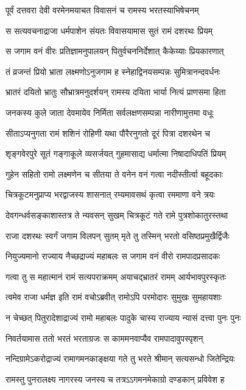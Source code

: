 \twolineshloka
{पूर्वं दत्तवरा देवी वरमेनमयाचत}
{विवासनं च रामस्य भरतस्याभिषेचनम्}%

\twolineshloka
{स सत्यवचनाद्राजा धर्मपाशेन संयतः}
{विवासयामास सुतं रामं दशरथः प्रियम्}%

\twolineshloka
{स जगाम वनं वीरः प्रतिज्ञामनुपालयन्}
{पितुर्वचननिर्देशात् कैकेय्याः प्रियकारणात्}%

\twolineshloka
{तं व्रजन्तं प्रियो भ्राता लक्ष्मणोऽनुजगाम ह}
{स्नेहाद्विनयसम्पन्नः सुमित्रानन्दवर्धनः}%

\twolineshloka
{भ्रातरं दयितो भ्रातुः सौभ्रात्रमनुदर्शयन्}
{रामस्य दयिता भार्या नित्यं प्राणसमा हिता}%

\twolineshloka
{जनकस्य कुले जाता देवमायेव निर्मिता}
{सर्वलक्षणसम्पन्ना नारीणामुत्तमा वधूः}%

\twolineshloka
{सीताऽप्यनुगता रामं शशिनं रोहिणी यथा}
{पौरैरनुगतो दूरं पित्रा दशरथेन च}%

\twolineshloka
{शृङ्गवेरपुरे सूतं गङ्गाकूले व्यसर्जयत्}
{गुहमासाद्य धर्मात्मा निषादाधिपतिं प्रियम्}%

\twolineshloka
{गुहेन सहितो रामो लक्ष्मणेन च सीतया}
{ते वनेन वनं गत्वा नदीस्तीर्त्वा बहूदकाः}%

\twolineshloka
{चित्रकूटमनुप्राप्य भरद्वाजस्य शासनात्}
{रम्यमावसथं कृत्वा रममाणा वने त्रयः}%

\twolineshloka
{देवगन्धर्वसङ्काशास्तत्र ते न्यवसन् सुखम्}
{चित्रकूटं गते रामे पुत्रशोकातुरस्तथा}%

\twolineshloka
{राजा दशरथः स्वर्गं जगाम विलपन् सुतम्}
{मृते तु तस्मिन् भरतो वसिष्ठप्रमुखैर्द्विजैः}%

\twolineshloka
{नियुज्यमानो राज्याय नैच्छद्राज्यं महाबलः}
{स जगाम वनं वीरो रामपादप्रसादकः}%

\twolineshloka
{गत्वा तु स महात्मानं रामं सत्यपराक्रमम्}
{अयाचद्भ्रातरं रामम् आर्यभावपुरस्कृतः}%

\twolineshloka
{त्वमेव राजा धर्मज्ञ इति रामं वचोऽब्रवीत्}
{रामोऽपि परमोदारः सुमुखः सुमहायशाः}%

\twolineshloka
{न चेच्छत् पितुरादेशाद्राज्यं रामो महाबलः}
{पादुके चास्य राज्याय न्यासं दत्त्वा पुनः पुनः}%

\twolineshloka
{निवर्तयामास ततो भरतं भरताग्रजः}
{स काममनवाप्यैव रामपादावुपस्पृशन्}%

\twolineshloka
{नन्दिग्रामेऽकरोद्राज्यं रामागमनकाङ्क्षया}
{गते तु भरते श्रीमान् सत्यसन्धो जितेन्द्रियः}%

\twolineshloka
{रामस्तु पुनरालक्ष्य नागरस्य जनस्य च}
{तत्रऽऽगमनमेकाग्रो दण्डकान् प्रविवेश ह}%

